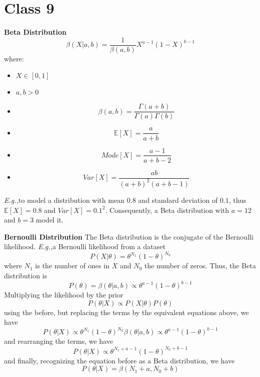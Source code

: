 \documentclass{article}
\newcommand{\Eg}{\textit{E.g.,}}
\begin{document}
\section{Class 9}
\textbf{Beta Distribution}
\begin{equation}
    \beta(X|a, b) = \frac{1}{\beta(a, b)}X^{a-1}(1 - X)^{b - 1}
\end{equation}
where:\begin{itemize}
    \item $X \in [0, 1]$
    \item $a, b > 0$
    \item \begin{equation}
        \beta(a, b) = \frac{\Gamma(a+b)}{\Gamma(a)\Gamma(b)}
    \end{equation}
    \item \begin{equation}
        \mathbb{E}[X] = \frac{a}{a+b}
    \end{equation}
    \item \begin{equation}
        Mode[X] = \frac{a-1}{a+b-2}
    \end{equation}
    \item \begin{equation}
        Var[X] = \frac{ab}{(a+b)^2(a+b-1)}
    \end{equation}
\end{itemize} 
\Eg to model a distribution with mean $0.8$ and standard deviation of $0.1$, thus $\mathbb{E}[X] = 0.8$ and $Var[X] = 0.1^2$. Consequently, a Beta distribution with $a = 12$ and $b = 3$ model it.

\textbf{Bernoulli Distribution}
The Beta distribution is the conjugate of the Bernoulli likelihood. \Eg a Bernoulli likelihood from a dataset
\begin{equation}
    P(X|\theta) = \theta^{N_1}(1-\theta)^{N_0}
\end{equation}
where $N_1$ is the number of ones in $X$ and $N_0$ the number of zeros. Thus, the Beta distribution is
\begin{equation}
    P(\theta) = \beta(\theta|a, b) \propto \theta^{a-1}(1-\theta)^{b-1}
\end{equation}
Multiplying the likelihood by the prior
\begin{equation}
    P(\theta|X) \propto P(X|\theta)P(\theta)
\end{equation}
using the before, but replacing the terms by the equivalent equations above, we have
\begin{equation}
    P(\theta|X) \propto \theta^{N_1}(1-\theta)^{N_0} \beta(\theta|a, b) \propto \theta^{a-1}(1-\theta)^{b-1}
\end{equation}
and rearranging the terms, we have
\begin{equation}
    P(\theta|X) \propto \theta^{N_1 + a - 1}(1 - \theta)^{N_0 + b - 1}
\end{equation}
and finally, recognizing the equation before as a Beta distribution, we have
\begin{equation}
    P(\theta|X) = \beta(N_1 + a, N_0 + b)
\end{equation}
\end{document}

